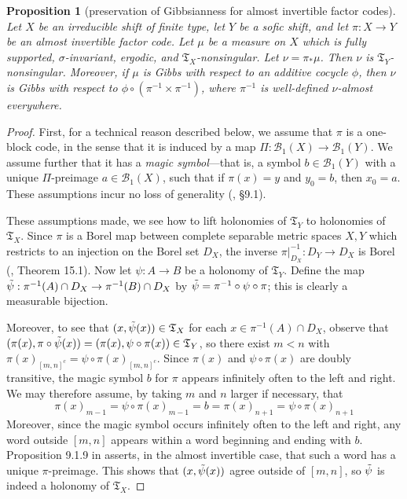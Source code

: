 \documentclass{amsproc}
\numberwithin{theorem}{section}
\newtheorem{proposition}[theorem]{Proposition}
\theoremstyle{remark}
\theoremstyle{definition}
\newcommand{\cB}{\mathcal{B}}
\newcommand{\fT}{\mathfrak{T}}
\theoremstyle{plain}
\begin{document}
\begin{proposition}[preservation of Gibbsianness for almost invertible factor codes]\label{prop-pres-gibbs}
Let $X$ be an irreducible shift of finite type, let $Y$ be a sofic shift, and let $\pi: X \to Y$ be an almost invertible factor code. Let $\mu$ be a measure on $X$ which is fully supported, $\sigma$-invariant, ergodic, and $\fT_X$-nonsingular. Let $\nu = \pi_* \mu$. Then $\nu$ is $\fT_Y$-nonsingular. Moreover, if $\mu$ is Gibbs with respect to an additive cocycle $\phi$, then $\nu$ is Gibbs with respect to $\phi \circ (\pi^{-1} \times \pi^{-1})$, where $\pi^{-1}$ is well-defined $\nu$-almost everywhere.
\end{proposition}

\begin{proof}
First, for a technical reason described below, we assume that $\pi$ is a one-block code, in the sense that it is induced by a map $\Pi\colon \cB_1(X) \to \cB_1(Y)$. We assume further that it has a \textit{magic symbol}---that is, a symbol $b \in \cB_1(Y)$ with a unique $\Pi$-preimage $a \in \cB_1(X)$, such that if $\pi(x)=y$ and $y_0 = b$, then $x_0 = a$. These assumptions incur no loss of generality (\cite{lind1995introduction}, \S9.1).

These assumptions made, we see how to lift holonomies of $\fT_Y$ to holonomies of $\fT_X$. Since $\pi$ is a Borel map between complete separable metric spaces $X,Y$ which restricts to an injection on the Borel set $D_X$, the inverse $\pi|_{D_X}^{-1}: D_Y \to D_X$  is Borel (\cite{kechris1995descriptive}, Theorem 15.1). Now let $\psi: A \to B$ be a holonomy of $\fT_Y$. Define the map $\Tilde{\psi} : \pi^{-1}(A) \cap D_X \to \pi^{-1}(B) \cap D_X$ by $\Tilde{\psi} = \pi^{-1} \circ \psi \circ \pi$; this is clearly a measurable bijection. 

Moreover, to see that $(x,\Tilde{\psi}(x)) \in \fT_X$  for each $x \in \pi^{-1}(A) \cap D_X$, observe that $(\pi(x), \pi \circ \Tilde{\psi}(x)) = (\pi(x), \psi \circ \pi(x)) \in \fT_Y$, so there exist $m < n$ with $\pi(x)_{[m,n]^c} = \psi \circ \pi(x)_{[m,n]^c}$. Since $\pi(x)$ and $\psi \circ \pi (x)$ are doubly transitive, the magic symbol $b$ for $\pi$ appears infinitely often to the left and right. We may therefore assume, by taking $m$ and $n$ larger if necessary, that
\[
\pi(x)_{m-1} = \psi \circ \pi(x)_{m-1} = b = \pi(x)_{n+1} = \psi \circ \pi(x)_{n+1}
\]
Moreover, since the magic symbol occurs infinitely often to the left and right, any word outside $[m,n]$ appears within a word beginning and ending with $b$. Proposition 9.1.9 in \cite{lind1995introduction} asserts, in the almost invertible case, that such a word has a unique $\pi$-preimage. This shows that $(x,\Tilde{\psi}(x))$ agree outside of $[m,n]$, so $\Tilde{\psi}$ is indeed a holonomy of $\fT_X$.


\end{proof}
\end{document}
